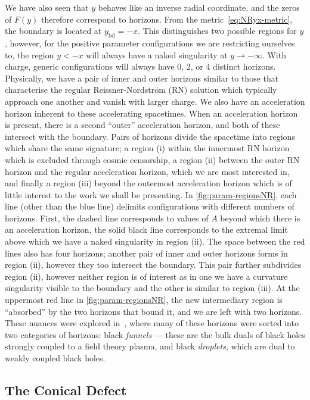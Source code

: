 \documentclass[
twoside,
openright,
frontopenright,
]{dmathesis}
\begin{document}
We have also seen that $y$ behaves like an inverse radial coordinate, and the
zeros of $F(y)$ therefore correspond to horizons. From the
metric~\eqref{eq:NRyx-metric}, the boundary is located at $y_\mathrm{bd} =
-x$. This distinguishes two possible regions for $y$, however, for the positive
parameter configurations we are restricting ourselves to, the region $y<-x$ will
always have a naked singularity at $y \to -\infty$. With charge, generic
configurations will always have 0, 2, or 4 distinct horizons. Physically, we
have a pair of inner and outer horizons similar to those that characterise the
regular Reissner-Nordstr\"om (RN) solution which typically approach one another
and vanish with larger charge. We also have an acceleration horizon inherent to
these accelerating spacetimes. When an acceleration horizon is present, there is
a second ``outer'' acceleration horizon, and both of these intersect with the
boundary. Pairs of horizons divide the spacetime into regions which share the
same signature; a region (i) within the innermost RN horizon which is excluded
through cosmic censorship, a region (ii) between the outer RN horizon and the
regular acceleration horizon, which we are most interested in, and finally a
region (iii) beyond the outermost acceleration horizon which is of little
interest to the work we shall be presenting. In \cref{fig:param-regionsNR}, each
line (other than the blue line) delimits configurations with different numbers
of horizons. First, the dashed line corresponds to values of $A$ beyond which
there is an acceleration horizon, the solid black line corresponds to the
extremal limit above which we have a naked singularity in region (ii). The space
between the red lines also has four horizons; another pair of inner and outer
horizons forms in region (ii), however they too intersect the boundary. This
pair further subdivides region (ii), however neither region is of interest as in
one we have a curvature singularity visible to the boundary and the other is
similar to region (iii). At the uppermost red line in
\cref{fig:param-regionsNR}, the new intermediary region is ``absorbed'' by the
two horizons that bound it, and we are left with two horizons. These nuances
were explored in~\cite{Hubeny:2009kz}, where many of these horizons were sorted
into two categories of horizons: black \emph{funnels} --- these are the bulk
duals of black holes strongly coupled to a field theory plasma, and black
\emph{droplets}, which are dual to weakly coupled black holes.

\subsection{The Conical Defect}
\label{sec:conical}
\end{document}
